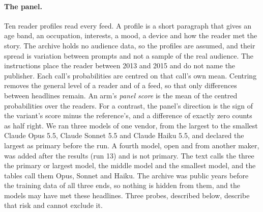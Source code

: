\paragraph{The panel.} Ten reader profiles read every feed. A profile is a short paragraph that gives an age band, an occupation, interests, a mood, a device and how the reader met the story. The archive holds no audience data, so the profiles are assumed, and their spread is variation between prompts and not a sample of the real audience. The instructions place the reader between 2013 and 2015 and do not name the publisher. Each call's probabilities are centred on that call's own mean. Centring removes the general level of a reader and of a feed, so that only differences between headlines remain. An arm's \emph{panel score} is the mean of the centred probabilities over the readers. For a contrast, the panel's direction is the sign of the variant's score minus the reference's, and a difference of exactly zero counts as half right. We ran three models of one vendor, from the largest to the smallest Claude Opus 5.5, Claude Sonnet 5.5 and Claude Haiku 5.5, and declared the largest as primary before the run. A fourth model, open and from another maker, was added after the results (run 13) and is not primary. The text calls the three the primary or largest model, the middle model and the smallest model, and the tables call them Opus, Sonnet and Haiku. The archive was public years before the training data of all three ends, so nothing is hidden from them, and the models may have met these headlines. Three probes, described below, describe that risk and cannot exclude it.

